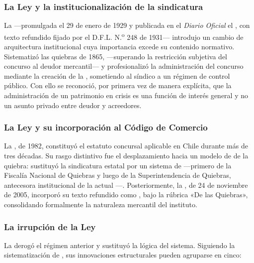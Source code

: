 \subsubsection{La Ley  y la institucionalización de la sindicatura}

La  \citeyearpar{ley-4558} ---promulgada el 29 de enero de 1929 y publicada en el
\emph{Diario Oficial} el , con texto refundido fijado por el
D.F.L. N.\textsuperscript{o} 248 de 1931--- introdujo un cambio de arquitectura institucional cuya
importancia excede su contenido normativo. Sistematizó las quiebras  de 1865,  ---superando
la restricción subjetiva del concurso al deudor mercantil--- y profesionalizó la administración del
concurso mediante la creación de la , sometiendo al
síndico a un régimen de control público. Con ello se reconoció, por primera vez de manera
explícita, que la administración de un patrimonio en crisis es una función de interés general y no
un asunto privado entre deudor y acreedores.

\subsubsection{La Ley  y su incorporación al Código de Comercio}

La  \citeyearpar{ley-18175}, de 1982, constituyó el estatuto concursal aplicable en
Chile durante más de tres décadas. Su rasgo distintivo fue el desplazamiento hacia un modelo de
 de la quiebra: sustituyó la sindicatura estatal por un sistema de
 ---primero de la Fiscalía Nacional
de Quiebras y luego de la Superintendencia de Quiebras, antecesora institucional de la actual
\superir{}---. Posteriormente, la , de 24 de noviembre de 2005, incorporó su texto
refundido como , bajo la rúbrica «De las Quiebras»,
consolidando formalmente la naturaleza mercantil del instituto.

\subsubsection{La irrupción de la Ley }

La \LIR{} \citeyearpar{ley-20720} derogó el régimen anterior y sustituyó la lógica del
sistema. Siguiendo la sistematización de \textcite{aj-texto-refundido}, sus innovaciones
estructurales pueden agruparse en cinco:

